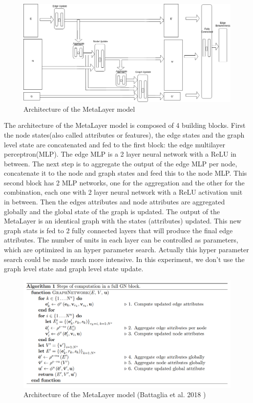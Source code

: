 \begin{figure}[H]
    \centering
        \includegraphics[width=0.85\linewidth]{img/GN_exp1_metalayer2.png}
    \caption{Architecture of the MetaLayer model}\label{fig:metalayer_diagram}
\end{figure}

 The architecture of the MetaLayer model is composed of 4 building blocks. First the node states(also called attributes or features), the edge states and the graph level state are concatenated and fed to the first block: the edge multilayer perceptron(MLP). The edge MLP is a 2 layer neural network with a ReLU in between. The next step is to aggregate the output of the edge MLP per node, concatenate it to the node and graph states and feed this to the node MLP. This second block has 2 MLP networks, one for the aggregation and the other for the combination, each one with 2 layer neural network with a ReLU activation unit in between. Then the edges attributes and node attributes are aggregated globally and the global state of the graph is updated. The output of the MetaLayer is an identical graph with the states (attributes) updated. This new graph stats is fed to 2 fully connected layers that will produce the final edge attributes. The number of units in each layer can be controlled as parameters, which are optimized in an hyper parameter search. Actually this hyper parameter search could be made much more intensive. In this experiment, we don't use the graph level state and graph level state update.

 \begin{figure}[H]
    \centering
        \includegraphics[width=0.85\linewidth]{img/metalayer-algorithm.png}
    \caption{Architecture of the MetaLayer model (Battaglia et al. 2018  \cite{battaglia2018relational} )}\label{fig:metalayer_algorithm}
\end{figure}

